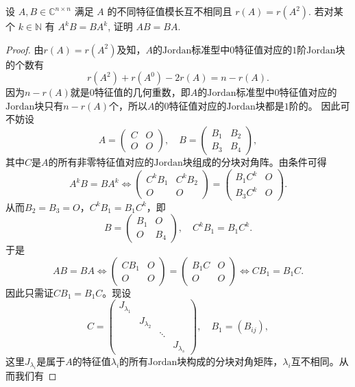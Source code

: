 \documentclass[../../main.tex]{subfiles}
\begin{document}
\begin{example}
设 \( A,B \in \mathbb{C}^{n \times n} \) 满足 \( A \) 的不同特征值模长互不相同且 \( r(A) = r(A^2) \). 若对某个 \( k \in \mathbb{N} \) 有 \( A^k B = BA^k \), 证明 \( AB = BA \).
\end{example}
\begin{proof}
由$r(A) = r(A^2)$及知，$A$的$\text{Jordan}$标准型中$0$特征值对应的$1$阶$\text{Jordan}$块的个数有
\[
r(A^2) + r(A^0) - 2r(A) = n - r(A).
\]
因为$n - r(A)$就是$0$特征值的几何重数，即$A$的$\text{Jordan}$标准型中$0$特征值对应的$\text{Jordan}$块只有$n - r(A)$个，所以$A$的$0$特征值对应的$\text{Jordan}$块都是$1$阶的。
因此可不妨设
\[
A = \begin{pmatrix}
C & O \\
O & O
\end{pmatrix}, \quad B = \begin{pmatrix}
B_1 & B_2 \\
B_3 & B_4
\end{pmatrix},
\]
其中$C$是$A$的所有非零特征值对应的$\text{Jordan}$块组成的分块对角阵。由条件可得
\[
A^k B = B A^k \Longleftrightarrow \begin{pmatrix}
C^k B_1 & C^k B_2 \\
O & O
\end{pmatrix} = \begin{pmatrix}
B_1 C^k & O \\
B_3 C^k & O
\end{pmatrix}.
\]
从而$B_2 = B_3 = O$，$C^k B_1 = B_1 C^k$，即
\[
B = \begin{pmatrix}
B_1 & O \\
O & B_4
\end{pmatrix}, \quad C^k B_1 = B_1 C^k.
\]
于是
\[
A B = B A \Longleftrightarrow \begin{pmatrix}
C B_1 & O \\
O & O
\end{pmatrix} = \begin{pmatrix}
B_1 C & O \\
O & O
\end{pmatrix} \Longleftrightarrow C B_1 = B_1 C.
\]
因此只需证$C B_1 = B_1 C$。现设
\[
C = \begin{pmatrix}
J_{\lambda_1} & & & \\
& J_{\lambda_2} & & \\
& & \ddots & \\
& & & J_{\lambda_s}
\end{pmatrix}, \quad B_1 = (B_{ij}),
\]
这里$J_{\lambda_i}$是属于$A$的特征值$\lambda_i$的所有$\text{Jordan}$块构成的分块对角矩阵，$\lambda_i$互不相同。从而我们有

\end{proof}
\end{document}
